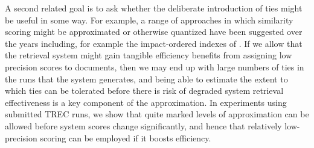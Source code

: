 A second related goal is to ask whether the deliberate introduction
of ties might be useful in some way.
For example, a range of approaches in which similarity scoring might
be approximated or otherwise quantized have been suggested over the
years including, for example
the impact-ordered indexes of {\citet{am06sigir}}.
If we allow that the retrieval system might gain tangible efficiency
benefits from assigning low precision scores to
documents,
then we may end up with large
numbers of ties in the runs that the system generates,
and being able to estimate the extent to which ties can
be tolerated before there is risk of degraded system retrieval
effectiveness is a key component of the approximation.
In experiments using submitted TREC runs, we show that quite marked
levels of approximation can be allowed before system scores change
significantly, and hence that relatively low-precision scoring can be
employed if it boosts efficiency.


